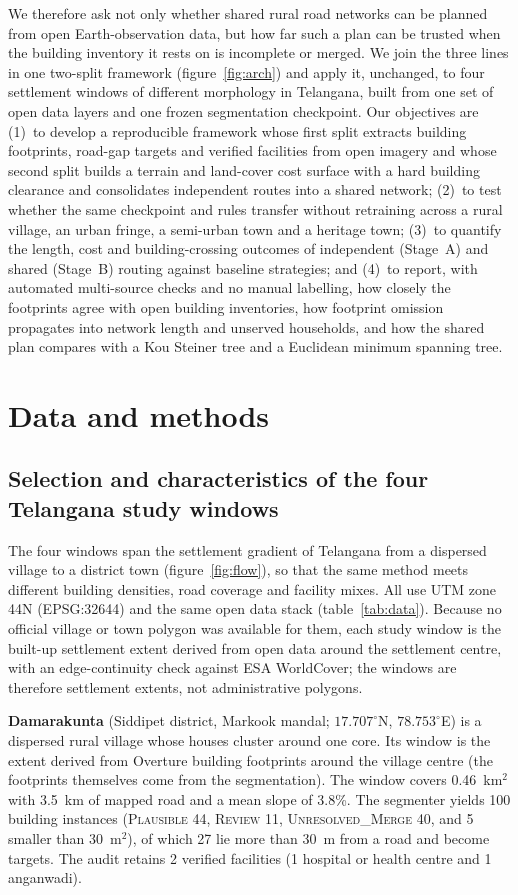 \documentclass[preprint,12pt]{elsarticle}
\begin{document}
We therefore ask not only whether shared rural road networks can be planned from open Earth-observation data, but how far such a plan can be trusted when the building inventory it rests on is incomplete or merged. We join the three lines in one two-split framework (figure~\ref{fig:arch}) and apply it, unchanged, to four settlement windows of different morphology in Telangana, built from one set of open data layers and one frozen segmentation checkpoint. Our objectives are (1)~to develop a reproducible framework whose first split extracts building footprints, road-gap targets and verified facilities from open imagery and whose second split builds a terrain and land-cover cost surface with a hard building clearance and consolidates independent routes into a shared network; (2)~to test whether the same checkpoint and rules transfer without retraining across a rural village, an urban fringe, a semi-urban town and a heritage town; (3)~to quantify the length, cost and building-crossing outcomes of independent (Stage~A) and shared (Stage~B) routing against baseline strategies; and (4)~to report, with automated multi-source checks and no manual labelling, how closely the footprints agree with open building inventories, how footprint omission propagates into network length and unserved households, and how the shared plan compares with a Kou Steiner tree and a Euclidean minimum spanning tree.

\section{Data and methods}\label{sec:data}
\subsection{Selection and characteristics of the four Telangana study windows}
The four windows span the settlement gradient of Telangana from a dispersed village to a district town (figure~\ref{fig:flow}), so that the same method meets different building densities, road coverage and facility mixes. All use UTM zone 44N (EPSG:32644) and the same open data stack (table~\ref{tab:data}). Because no official village or town polygon was available for them, each study window is the built-up settlement extent derived from open data around the settlement centre, with an edge-continuity check against ESA WorldCover; the windows are therefore settlement extents, not administrative polygons.

\textbf{Damarakunta} (Siddipet district, Markook mandal; $17.707^{\circ}$N, $78.753^{\circ}$E) is a dispersed rural village whose houses cluster around one core. Its window is the extent derived from Overture building footprints around the village centre (the footprints themselves come from the segmentation). The window covers 0.46~km$^2$ with 3.5~km of mapped road and a mean slope of 3.8\%. The segmenter yields 100 building instances (\textsc{Plausible} 44, \textsc{Review} 11, \textsc{Unresolved\_Merge} 40, and 5 smaller than 30~m$^2$), of which 27 lie more than 30~m from a road and become targets. The audit retains 2 verified facilities (1 hospital or health centre and 1 anganwadi). 
\end{document}
